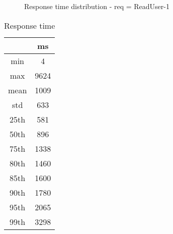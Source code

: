\begin{minipage}{0.75\linewidth}
\begin{figure}[h]
\begin{adjustbox}{max width=1.0\linewidth, keepaspectratio}
  \end{adjustbox}
  \caption{Response time distribution - req = ReadUser-1}
\end{figure}
\end{minipage}\hfill\begin{minipage}{0.18\linewidth}
\begin{table}[h]
\begin{tabular}{|cc|}
\hline
\textbf{} & \textbf{ms}\\ \hline
 \Xhline{0.005\arrayrulewidth}
min & 4\\
 \Xhline{0.005\arrayrulewidth}
max & 9624\\
 \Xhline{0.005\arrayrulewidth}
mean & 1009\\
 \Xhline{0.005\arrayrulewidth}
std & 633\\
\hline
\hline
 \Xhline{0.005\arrayrulewidth}
25th & 581\\
 \Xhline{0.005\arrayrulewidth}
50th & 896\\
 \Xhline{0.005\arrayrulewidth}
75th & 1338\\
 \Xhline{0.005\arrayrulewidth}
80th & 1460\\
 \Xhline{0.005\arrayrulewidth}
85th & 1600\\
 \Xhline{0.005\arrayrulewidth}
90th & 1780\\
 \Xhline{0.005\arrayrulewidth}
95th & 2065\\
 \Xhline{0.005\arrayrulewidth}
99th & 3298\\
\hline
\end{tabular}
\caption{Response time}
\end{table}
\end{minipage}\hfill